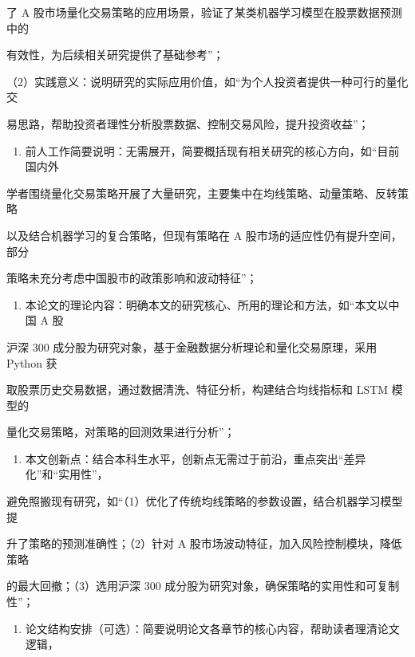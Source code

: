 \documentclass[
]{article}
\providecommand{\tightlist}{%
  \setlength{\itemsep}{0pt}\setlength{\parskip}{0pt}}
\begin{document}
了 A
股市场量化交易策略的应用场景，验证了某类机器学习模型在股票数据预测中的

有效性，为后续相关研究提供了基础参考''；

（2）实践意义：说明研究的实际应用价值，如``为个人投资者提供一种可行的量化交

易思路，帮助投资者理性分析股票数据、控制交易风险，提升投资收益''；

\begin{enumerate}
\def\labelenumi{\arabic{enumi}.}
\setcounter{enumi}{2}
\tightlist
\item
  前人工作简要说明：无需展开，简要概括现有相关研究的核心方向，如``目前国内外
\end{enumerate}

学者围绕量化交易策略开展了大量研究，主要集中在均线策略、动量策略、反转策略

以及结合机器学习的复合策略，但现有策略在 A
股市场的适应性仍有提升空间，部分

策略未充分考虑中国股市的政策影响和波动特征''；

\begin{enumerate}
\def\labelenumi{\arabic{enumi}.}
\setcounter{enumi}{3}
\tightlist
\item
  本论文的理论内容：明确本文的研究核心、所用的理论和方法，如``本文以中国
  A 股
\end{enumerate}

沪深 300 成分股为研究对象，基于金融数据分析理论和量化交易原理，采用
Python 获

取股票历史交易数据，通过数据清洗、特征分析，构建结合均线指标和 LSTM
模型的

量化交易策略，对策略的回测效果进行分析''；

\begin{enumerate}
\def\labelenumi{\arabic{enumi}.}
\setcounter{enumi}{4}
\tightlist
\item
  本文创新点：结合本科生水平，创新点无需过于前沿，重点突出``差异化''和``实用性''，
\end{enumerate}

避免照搬现有研究，如``（1）优化了传统均线策略的参数设置，结合机器学习模型提

升了策略的预测准确性；（2）针对 A
股市场波动特征，加入风险控制模块，降低策略

的最大回撤；（3）选用沪深 300
成分股为研究对象，确保策略的实用性和可复制性''；

\begin{enumerate}
\def\labelenumi{\arabic{enumi}.}
\setcounter{enumi}{5}
\tightlist
\item
  论文结构安排（可选）：简要说明论文各章节的核心内容，帮助读者理清论文逻辑，
\end{enumerate}
\end{document}
